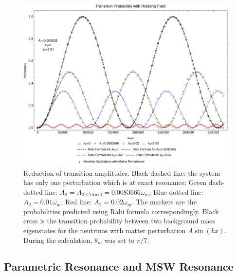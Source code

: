 \documentclass[%
preprint,
 amsmath,amssymb,
 aps,
]{revtex4-1}
\begin{document}
\begin{figure}[!htbp]
                \centering
                \includegraphics[width=\textwidth]{assets/rabi-oscillations-energy-gap-change-k2-0-01}
                \caption{Reduction of transition amplitudes. Black dashed line: the system has only one perturbation which is at exact resonance; Green dash-dotted line: $A_2=A_{2,\mathrm{Critical}}=0.0083666\omega_{\mathrm m}$; Blue dotted line: $A_2=0.01\omega_{\mathrm m}$; Red line: $A_2=0.02\omega_{\mathrm m}$. The markers are the probabilities predicted using Rabi formula correspondingly. Black cross is the transition probability between two background mass eigenstates for the neutrinos with matter perturbation $A\sin(kx)$. During the calculation, $\theta_m$ was set to $\pi/7$.}
                \label{fig-rabi-oscillations-energy-gap-change}
\end{figure}



\subsection{Parametric Resonance and MSW Resonance}


\end{document}
